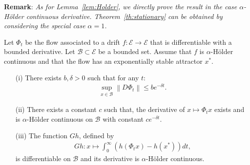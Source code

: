 \documentclass[sigconf]{acmart}
\newcommand\E{\mathcal{E}}
\newcommand\calB{\mathcal{B}}
\newcommand\norm[1]{\left\|#1\right\|}
\newcommand\p[1]{\left(#1\right)}
\begin{document}
\textbf{Remark}: \emph{As for Lemma~\ref{lem:Holder}, we directly
  prove the result in the case $\alpha$-Hölder continuous derivative.
  Theorem~\ref{th:stationary} can be obtained by considering the
  special case $\alpha=1$. } \medskip

\begin{lemma}
  \label{lem:proof_ss} 
  Let $\Phi_t$ be the flow associated to a drift $f:\E\to\E$ that is
  differentiable with a bounded derivative. Let $\calB\subset\E$ be a
  bounded set. Assume that $f$ is $\alpha$-Hölder continuous and that
  the flow has an exponentially stable attractor $x^*$.
  \begin{itemize}
  \item[(i)] There exists $b,\delta>0$ such that for any $t$:
    \begin{align*}
      \sup_{x\in\calB}\norm{D\Phi_t}\le be^{-\delta t}. 
    \end{align*}
  \item[(ii)] There exists a constant $c$ such that, the derivative of
    $x\mapsto\Phi_tx$ exists and is $\alpha$-Hölder continuous on
    $\calB$ with constant $ce^{-\delta t}$.
  \item[(iii)] The function $Gh$, defined by 
    \begin{align*}
      Gh : x\mapsto \int_0^\infty \p{h(\Phi_t x)-h(x^*)}dt, 
    \end{align*}
    is differentiable on $\calB$ and its derivative is $\alpha$-Hölder
    continuous.
  \end{itemize}
\end{lemma}
\end{document}
